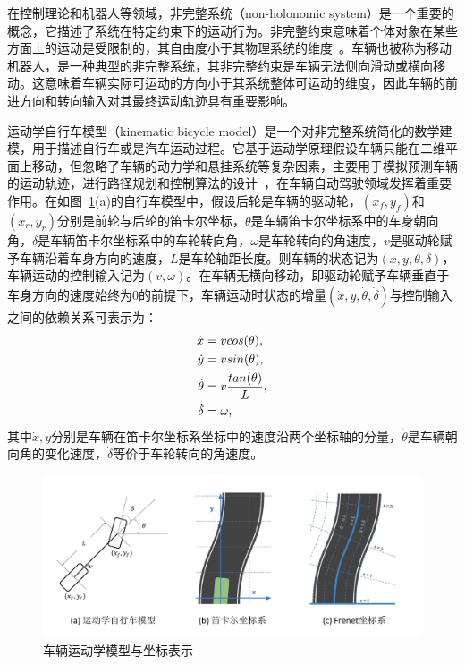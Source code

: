 在控制理论和机器人等领域，非完整系统（non-holonomic system）是一个重要的概念，它描述了系统在特定约束下的运动行为。非完整约束意味着个体对象在某些方面上的运动是受限制的，其自由度小于其物理系统的维度~\cite{ne_mark2004dynamics}。车辆也被称为移动机器人，是一种典型的非完整系统，其非完整约束是车辆无法侧向滑动或横向移动。这意味着车辆实际可运动的方向小于其系统整体可运动的维度，因此车辆的前进方向和转向输入对其最终运动轨迹具有重要影响。


运动学自行车模型（kinematic bicycle model）是一个对非完整系统简化的数学建模，用于描述自行车或是汽车运动过程。它基于运动学原理假设车辆只能在二维平面上移动，但忽略了车辆的动力学和悬挂系统等复杂因素，主要用于模拟预测车辆的运动轨迹，进行路径规划和控制算法的设计~\cite{d1991modelling, kanayama1991stable, kong2015kinematic, polack2017kinematic, freire2022optimal}，在车辆自动驾驶领域发挥着重要作用。在如图~\ref{fig:intro_bicycle&frenet}(a)的自行车模型中，假设后轮是车辆的驱动轮，$(x_f, y_f)$和$(x_r, y_r)$分别是前轮与后轮的笛卡尔坐标，$\theta$是车辆笛卡尔坐标系中的车身朝向角，$\delta$是车辆笛卡尔坐标系中的车轮转向角，$\omega$是车轮转向的角速度，$v$是驱动轮赋予车辆沿着车身方向的速度，$L$是车轮轴距长度。则车辆的状态记为$(x, y, \theta, \delta)$，车辆运动的控制输入记为$(v, \omega)$。在车辆无横向移动，即驱动轮赋予车辆垂直于车身方向的速度始终为0的前提下，车辆运动时状态的增量$(\dot{x}, \dot{y}, \dot{\theta}, \dot{\delta})$与控制输入之间的依赖关系可表示为：%
\begin{equation}
\setlength\abovedisplayskip{10pt}
\setlength\belowdisplayskip{10pt}
\begin{aligned}
    \dot{x} &= vcos(\theta), \\
    \dot{y} &= vsin(\theta), \\
    \dot{\theta} &= v\frac{tan(\theta)}{L}, \\
    \dot{\delta} &= \omega,
\end{aligned}
\label{eq:intro_bicycle1}
\end{equation}
其中$\dot{x}, \dot{y}$分别是车辆在笛卡尔坐标系坐标中的速度沿两个坐标轴的分量，$\dot{\theta}$是车辆朝向角的变化速度，$\dot{\delta}$等价于车轮转向的角速度。

\begin{figure}[!tbh]
\centering
\includegraphics[width=\textwidth]{figure/intro/bicycle & frenet v2.pdf}
\caption[车辆运动学模型与坐标表示]{
车辆运动学模型与坐标表示
}
\label{fig:intro_bicycle&frenet}
\end{figure}

